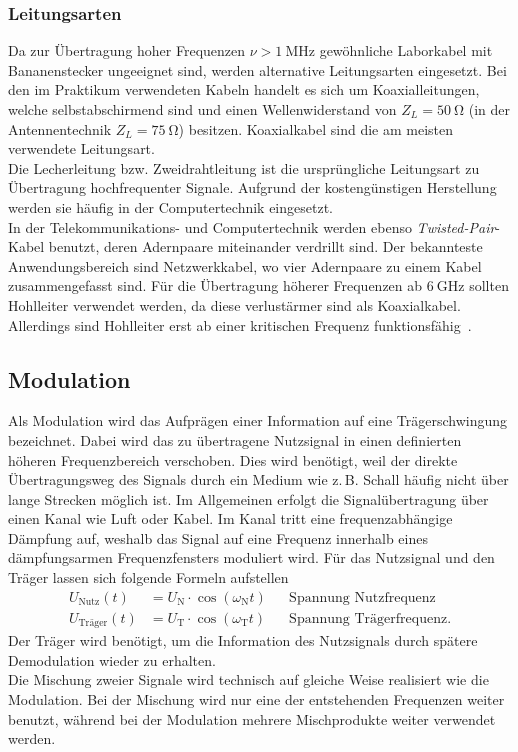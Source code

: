 \documentclass[a4paper,twoside,final]{article}
\begin{document}
\subsubsection{Leitungsarten}
Da zur Übertragung hoher Frequenzen $\nu > \SI{1}{\mega\hertz}$ gewöhnliche Laborkabel mit Bananenstecker ungeeignet sind, werden alternative Leitungsarten eingesetzt. Bei den im Praktikum verwendeten Kabeln handelt es sich um Koaxialleitungen, welche selbstabschirmend sind und einen Wellenwiderstand von $Z_L = \SI{50}{\ohm}$ (in der Antennentechnik $Z_L = \SI{75}{\ohm}$) besitzen. Koaxialkabel sind die am meisten verwendete Leitungsart.\\
Die Lecherleitung bzw. Zweidrahtleitung ist die ursprüngliche Leitungsart zu Übertragung hochfrequenter Signale. Aufgrund der kostengünstigen Herstellung werden sie häufig in der Computertechnik eingesetzt.\\
In der Telekommunikations- und Computertechnik werden ebenso \textit{Twisted-Pair}-Kabel benutzt, deren Adernpaare miteinander verdrillt sind. Der bekannteste Anwendungsbereich sind Netzwerkkabel, wo vier Adernpaare zu einem Kabel zusammengefasst sind.
Für die Übertragung höherer Frequenzen ab $\SI{6}{\giga\hertz}$ sollten Hohlleiter verwendet werden, da diese verlustärmer sind als Koaxialkabel. Allerdings sind Hohlleiter erst ab einer kritischen Frequenz funktionsfähig~\cite{Perner}.

\subsection{Modulation}
Als Modulation wird das Aufprägen einer Information auf eine Trägerschwingung bezeichnet. Dabei wird das zu übertragene Nutzsignal in einen definierten höheren Frequenzbereich verschoben. Dies wird benötigt, weil der direkte Übertragungsweg des Signals durch ein Medium wie z.\,B. Schall häufig nicht über lange Strecken möglich ist. Im Allgemeinen erfolgt die Signalübertragung über einen Kanal wie Luft oder Kabel. Im Kanal tritt eine frequenzabhängige Dämpfung auf, weshalb das Signal auf eine Frequenz innerhalb eines dämpfungsarmen Frequenzfensters moduliert wird. Für das Nutzsignal und den Träger lassen sich folgende Formeln aufstellen
\begin{align}
    U_\text{Nutz}(t) &= U_\text{N}\cdot\cos(\omega_\text{N}t) & &\text{Spannung Nutzfrequenz}\\
    U_\text{Träger}(t) &= U_\text{T}\cdot\cos(\omega_\text{T}t) & &\text{Spannung Trägerfrequenz}.
\end{align}
Der Träger wird benötigt, um die Information des Nutzsignals durch spätere Demodulation wieder zu erhalten.\\
Die Mischung zweier Signale wird technisch auf gleiche Weise realisiert wie die Modulation. Bei der Mischung wird nur eine der entstehenden Frequenzen weiter benutzt, während bei der Modulation mehrere Mischprodukte weiter verwendet werden.
\end{document}
